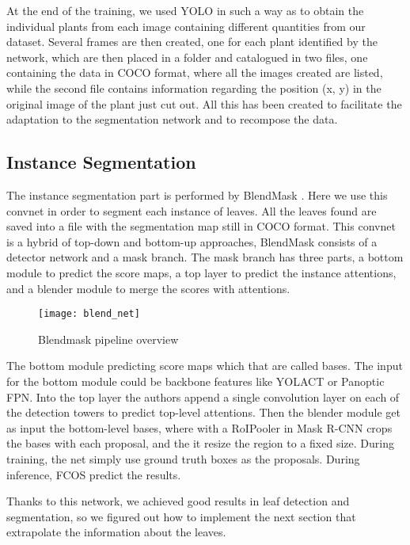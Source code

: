 At the end of the training, we used YOLO in such a way as to obtain the individual plants from each image containing different quantities from our dataset. Several
frames are then created, one for each plant identified by the network, which are then placed in a folder and catalogued in two files, one containing the data in COCO
\cite{lin2014microsoft} format, where all the images created are listed, while the second file contains information regarding the position (x, y) in the original image
of the plant just cut out. All this has been created to facilitate the adaptation to the segmentation network and to recompose the data.


\subsection{Instance Segmentation}
The instance segmentation part is performed by BlendMask \cite{chen2020blendmask}. Here we use this convnet in order to segment each instance of leaves. All the leaves found
are saved into a file with the segmentation map still in COCO format. This convnet is a hybrid of top-down and bottom-up approaches, BlendMask consists of a detector
network and a mask branch. The mask branch has three parts, a bottom module to predict the score maps, a top layer to predict the instance
attentions, and a blender module to merge the scores with attentions. 

\begin{figure}[ht]
    \centering
    \texttt{[image: blend\_net]} 
    \caption{Blendmask pipeline overview}
\end{figure}

The bottom module predicting score maps which that are called bases. The input for the bottom module could be backbone features like YOLACT or Panoptic FPN. 
Into the top layer the authors append a single convolution layer on each of the detection towers to predict top-level attentions. Then the blender module get as input the 
bottom-level bases, where with a RoIPooler in Mask R-CNN crops the bases with each proposal, and the it resize the region to a fixed size.
During training, the net simply use ground truth boxes as the proposals. During inference, FCOS \cite{tian2019fcos} predict the results. 

Thanks to this network, we achieved good results in leaf detection and segmentation, so we figured out how to implement the next section that extrapolate the information about
the leaves. 




